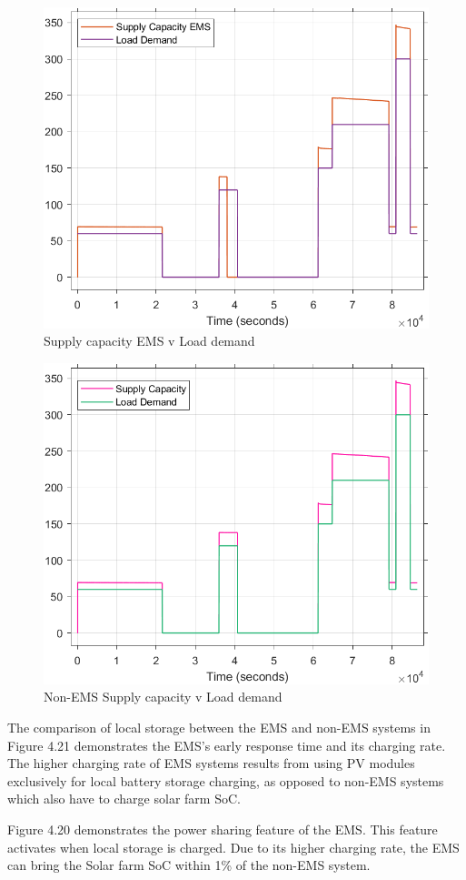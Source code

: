\begin{figure}[H]
	\centering
	\includegraphics[totalheight=8cm]{Figures/supply capacity ems v load demand.png}
	\caption{Supply capacity EMS v Load demand}
\end{figure}
\begin{figure}[H]
	\centering
	\includegraphics[totalheight=8cm]{Figures/non-ems supply capacity v load demand.png}
	\caption{Non-EMS Supply capacity v Load demand}
\end{figure}
The comparison of local storage between the EMS and non-EMS systems in Figure 4.21 demonstrates the EMS's early response time and its charging rate. The higher charging rate of EMS systems results from using PV modules exclusively for local battery storage charging, as opposed to non-EMS systems which also have to charge solar farm SoC. \par
Figure 4.20 demonstrates the power sharing feature of the EMS. This feature activates when local storage is charged. Due to its higher charging rate, the EMS can bring the Solar farm SoC within 1\% of the non-EMS system.


